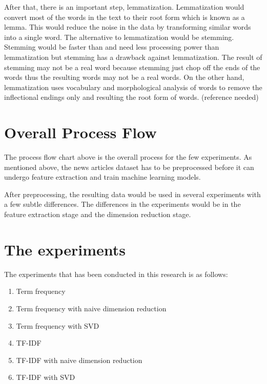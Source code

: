 After that, there is an important step, lemmatization. Lemmatization would convert most of the words in the text to their root form which is known as a lemma. This would reduce the noise in the data by transforming similar words into a single word. The alternative to lemmatization would be stemming. Stemming would be faster than and need less processing power than lemmatization but stemming has a drawback against lemmatization. The result of stemming may not be a real word because stemming just chop off the ends of the words thus the resulting words may not be a real words. On the other hand, lemmatization uses vocabulary and morphological analysis of words to remove the inflectional endings only and resulting the root form of words.
(reference needed)


\section{Overall Process Flow}

The process flow chart above is the overall process for the few experiments. As mentioned above, the news articles dataset has to be preprocessed before it can undergo feature extraction and train machine learning models.

After preprocessing, the resulting data would be used in several experiments with a few subtle differences.
The differences in the experiments would be in the feature extraction stage and the dimension reduction stage. 

\section{The experiments}
The experiments that has been conducted in this research is as follows:
\begin{enumerate}
	\item Term frequency
	\item Term frequency with naive dimension reduction
	\item Term frequency with SVD
	\item TF-IDF
	\item TF-IDF with naive dimension reduction
	\item TF-IDF with SVD
\end{enumerate}


